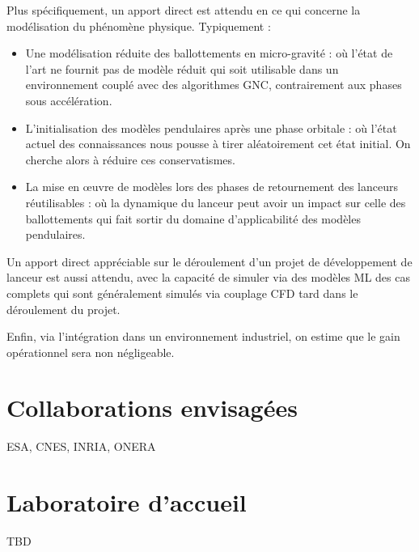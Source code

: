 \documentclass[12pt]{article}
\begin{document}
	Plus spécifiquement, un apport direct est attendu en ce qui concerne la modélisation du phénomène physique. Typiquement :
	\begin{itemize}
		\item Une modélisation réduite des ballottements en micro-gravité : où l'état de l'art ne fournit pas de modèle réduit qui soit utilisable dans un environnement couplé avec des algorithmes GNC, contrairement aux phases sous accélération.
		\item L'initialisation des modèles pendulaires après une phase orbitale : où l'état actuel des connaissances nous pousse à tirer aléatoirement cet état initial. On cherche alors à réduire ces conservatismes.
		\item La mise en œuvre de modèles lors des phases de retournement des lanceurs réutilisables : où la dynamique du lanceur peut avoir un impact sur celle des ballottements qui fait sortir du domaine d'applicabilité des modèles pendulaires.
	\end{itemize}
	Un apport direct appréciable sur le déroulement d'un projet de développement de lanceur est aussi attendu, avec la capacité de simuler via des modèles ML des cas complets qui sont généralement simulés via couplage CFD tard dans le déroulement du projet.
	
	Enfin, via l'intégration dans un environnement industriel, on estime que le gain opérationnel sera non négligeable.
	
	\nocite{*}
	
	\printbibliography[title=Bibliographie indicative]
	
	\section*{Collaborations envisagées}
	
	ESA, CNES, INRIA, ONERA
	
	\section*{Laboratoire d'accueil}
	
	TBD
	
\end{document}
